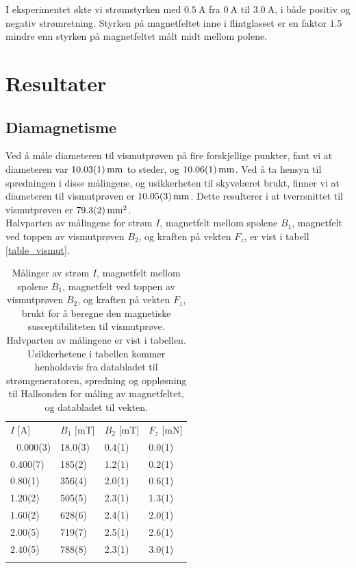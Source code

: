 \documentclass[%
 reprint,
 amsmath,amssymb,
 aps,
 norsk,
]{revtex4-1}
\begin{document}
I eksperimentet økte vi strømstyrken med $\SI{0.5}{\ampere}$ fra $\SI{0}{\ampere}$ til $\SI{3.0}{\ampere}$, i både positiv og negativ strømretning. Styrken på magnetfeltet inne i flintglasset er en faktor $1.5$ mindre enn styrken på magnetfeltet målt midt mellom polene.
\section{\label{sec:level4}Resultater}
\subsection{Diamagnetisme}
Ved å måle diameteren til vismutprøven på fire forskjellige punkter, fant vi at diameteren var $\SI{10.03\pm0.01}{\milli\meter}$ to steder, og $\SI{10.06\pm0.01}{\milli\meter}$. Ved å ta hensyn til spredningen i disse målingene, og usikkerheten til skyvelæret brukt, finner vi at diameteren til vismutprøven er $\SI{10.05\pm0.03}{\milli\meter}$. Dette resulterer i at tverrsnittet til vismutprøven er $\SI{79.3\pm0.2}{\milli\meter^2}$.\\
Halvparten av målingene for strøm $I$, magnetfelt mellom spolene $B_1$, magnetfelt ved toppen av vismutprøven $B_2$, og kraften på vekten $F_z$, er vist i tabell \vref{table_vismut}.
\begin{table}
  \centering
  \caption{Målinger av strøm $I$, magnetfelt mellom spolene $B_1$, magnetfelt ved toppen av vismutprøven $B_2$, og kraften på vekten $F_z$, brukt for å beregne den magnetiske susceptibiliteten til vismutprøve. Halvparten av målingene er vist i tabellen. Usikkerhetene i tabellen kommer henholdsvis fra databladet til strømgeneratoren, spredning og oppløsning til Hallsonden for måling av magnetfeltet, og databladet til vekten.}
  \label{table_vismut}
    \begin{tabular}{@{}llll@{}}\botrule
    $I$ {[}A{]} & $B_1$ {[}mT{]} & $B_2$ {[}mT{]} & $F_z$ {[}mN{]} \\ \colrule 
    0.000(3)    & 18.0(3)        & 0.4(1)         & 0.0(1)      \\
    0.400(7)    & 185(2)         & 1.2(1)         & 0.2(1)      \\
    0.80(1)     & 356(4)         & 2.0(1)         & 0.6(1)      \\
    1.20(2)     & 505(5)         & 2.3(1)         & 1.3(1)        \\
    1.60(2)     & 628(6)         & 2.4(1)         & 2.0(1)        \\
    2.00(5)     & 719(7)         & 2.5(1)         & 2.6(1)        \\
    2.40(5)     & 788(8)         & 2.3(1)         & 3.0(1)        \\\botrule
    \end{tabular}
\end{table}
\end{document}
